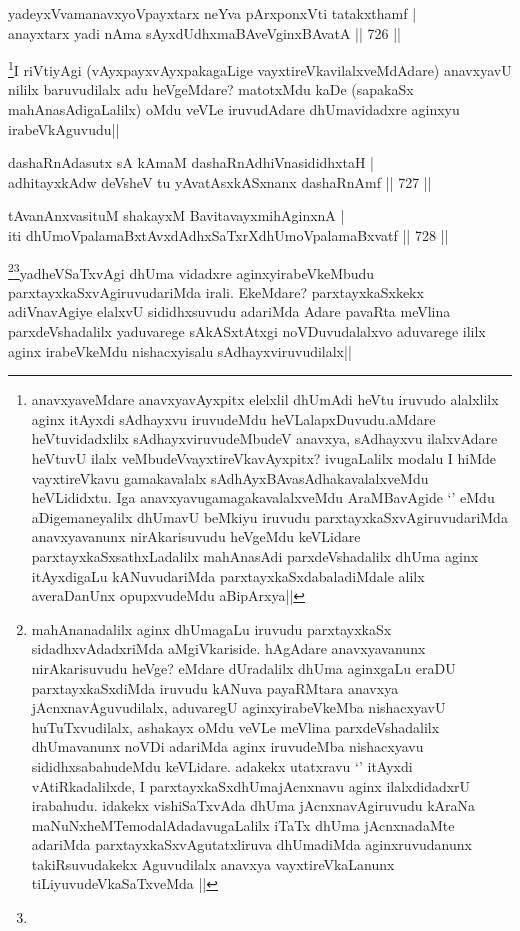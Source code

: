 
\begin{shl}
yadeyxVvamanavxyoV\s payxtarx neYva pArxponxVti tatakxthamf | \\
anayxtarx yadi nAma sAyxdUdhxmaBAveV\s ginxBAvatA \hfill||  726 ||  
\end{shl}

\begin{artha}
\footnote{anavxyaveMdare anavxyavAyxpitx elelxlil dhUmAdi heVtu iruvudo alalxlilx aginx itAyxdi sAdhayxvu iruvudeMdu heVLalapxDuvudu.aMdare heVtuvidadxlilx sAdhayxviruvudeMbudeV anavxya, sAdhayxvu ilalxvAdare heVtuvU ilalx veMbudeVvayxtireVkavAyxpitx? ivugaLalilx modalu I hiMde vayxtireVkavu gamakavalalx sAdhAyxBAvasAdhakavalalxveMdu heVLididxtu. Iga anavxyavugamagakavalalxveMdu AraMBavAgide `\stext' eMdu aDigemaneyalilx dhUmavU beMkiyu iruvudu parxtayxkaSxvAgiruvudariMda anavxyavanunx nirAkarisuvudu heVgeMdu keVLidare parxtayxkaSxsathxLadalilx mahAnasAdi parxdeVshadalilx dhUma aginx itAyxdigaLu kANuvudariMda parxtayxkaSxdabaladiMdale alilx averaDanUnx opupxvudeMdu aBipArxya||}I riVtiyAgi (vAyxpayxvAyxpakagaLige vayxtireVkavilalxveMdAdare) anavxyavU nililx baruvudilalx adu heVgeMdare? matotxMdu kaDe (sapakaSx mahAnasAdigaLalilx) oMdu veVLe iruvudAdare dhUmavidadxre aginxyu irabeVkAguvudu||
\end{artha}

\begin{shl}
dashaRnAdasutx sA kAmaM dashaRnAdhiVnasididhxtaH | \\
adhitayxkAdw deVsheV tu yAvatAsxkASxnanx dashaRnAmf \hfill||  727 ||  
\end{shl}

\begin{shl}
tAvanAnxvasituM shakayxM BavitavayxmihAginxnA | \\
iti dhUmoVpalamaBxtAvxdAdhxSaTxrXdhUmoVpalamaBxvatf \hfill||  728 ||  
\end{shl}

\begin{artha}
\footnote{mahAnanadalilx aginx dhUmagaLu iruvudu parxtayxkaSx sidadhxvAdadxriMda aMgiVkariside. hAgAdare anavxyavanunx nirAkarisuvudu heVge? eMdare dUradalilx dhUma aginxgaLu eraDU parxtayxkaSxdiMda iruvudu kANuva payaRMtara anavxya jAcnxnavAguvudilalx, aduvaregU aginxyirabeVkeMba nishacxyavU huTuTxvudilalx, ashakayx oMdu veVLe meVlina parxdeVshadalilx dhUmavanunx noVDi adariMda aginx iruvudeMba nishacxyavu sididhxsabahudeMdu keVLidare. adakekx utatxravu `\stext' itAyxdi vAtiRkadalilxde, I parxtayxkaSxdhUmajAcnxnavu aginx ilalxdidadxrU irabahudu. idakekx vishiSaTxvAda dhUma jAcnxnavAgiruvudu kAraNa maNuNxheMTemodalAdadavugaLalilx iTaTx dhUma jAcnxnadaMte adariMda parxtayxkaSxvAgutatxliruva dhUmadiMda aginxruvudanunx takiRsuvudakekx Aguvudilalx anavxya vayxtireVkaLanunx tiLiyuvudeVkaSaTxveMda ||}\footnote{}yadheVSaTxvAgi dhUma vidadxre aginxyirabeVkeMbudu parxtayxkaSxvAgiruvudariMda irali. EkeMdare? parxtayxkaSxkekx adiVnavAgiye elalxvU sididhxsuvudu adariMda Adare pavaRta meVlina parxdeVshadalilx yaduvarege sAkASxtAtxgi noVDuvudalalxvo aduvarege ililx aginx irabeVkeMdu nishacxyisalu sAdhayxviruvudilalx||
\end{artha}


